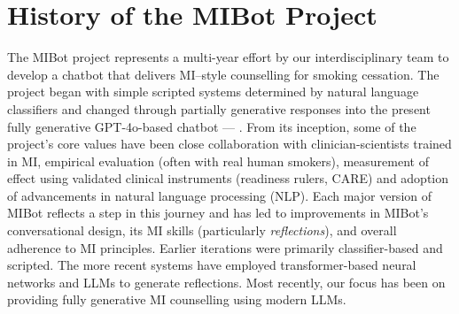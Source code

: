 \chapter{History of the MIBot Project}

\label{app:mibot_version_list}

\noindent The MIBot project represents a multi-year effort by our interdisciplinary team to develop a chatbot that delivers MI–style counselling for smoking cessation. The project began with simple scripted systems determined by natural language classifiers and changed through partially generative responses into the present fully generative GPT-4o-based chatbot --- \sysnamewithv. From its inception, some of the project's core values have been close collaboration with clinician-scientists trained in MI, empirical evaluation (often with real human smokers), measurement of effect using validated clinical instruments (readiness rulers, CARE) and adoption of advancements in natural language processing (NLP). Each major version of MIBot reflects a step in this journey and has led to improvements in MIBot's conversational design, its MI skills (particularly \textit{reflections}), and overall adherence to MI principles. Earlier iterations were primarily classifier-based and scripted. The more recent systems have employed transformer-based neural networks and LLMs to generate reflections. Most recently, our focus has been on providing fully generative MI counselling using modern LLMs.

